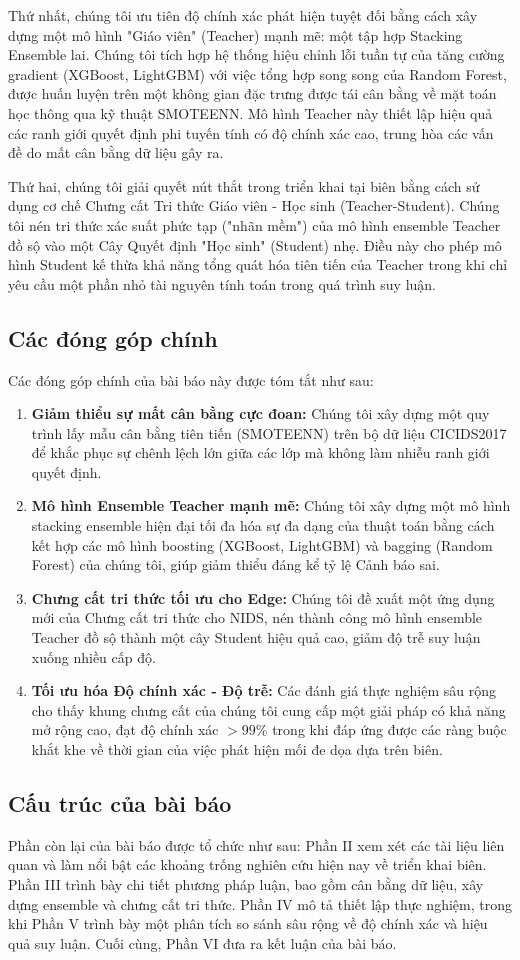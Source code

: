 Thứ nhất, chúng tôi ưu tiên độ chính xác phát hiện tuyệt đối bằng cách xây dựng một mô hình "Giáo viên" (Teacher) mạnh mẽ: một tập hợp Stacking Ensemble lai. Chúng tôi tích hợp hệ thống hiệu chỉnh lỗi tuần tự của tăng cường gradient (XGBoost, LightGBM) với việc tổng hợp song song của Random Forest, được huấn luyện trên một không gian đặc trưng được tái cân bằng về mặt toán học thông qua kỹ thuật SMOTEENN. Mô hình Teacher này thiết lập hiệu quả các ranh giới quyết định phi tuyến tính có độ chính xác cao, trung hòa các vấn đề do mất cân bằng dữ liệu gây ra.

Thứ hai, chúng tôi giải quyết nút thắt trong triển khai tại biên bằng cách sử dụng cơ chế Chưng cất Tri thức Giáo viên - Học sinh (Teacher-Student). Chúng tôi nén tri thức xác suất phức tạp ("nhãn mềm") của mô hình ensemble Teacher đồ sộ vào một Cây Quyết định "Học sinh" (Student) nhẹ. Điều này cho phép mô hình Student kế thừa khả năng tổng quát hóa tiên tiến của Teacher trong khi chỉ yêu cầu một phần nhỏ tài nguyên tính toán trong quá trình suy luận.

\subsection{Các đóng góp chính}
Các đóng góp chính của bài báo này được tóm tắt như sau:
\begin{enumerate}
    \item \textbf{Giảm thiểu sự mất cân bằng cực đoan:} Chúng tôi xây dựng một quy trình lấy mẫu cân bằng tiên tiến (SMOTEENN) trên bộ dữ liệu CICIDS2017 để khắc phục sự chênh lệch lớn giữa các lớp mà không làm nhiễu ranh giới quyết định.
    \item \textbf{Mô hình Ensemble Teacher mạnh mẽ:} Chúng tôi xây dựng một mô hình stacking ensemble hiện đại tối đa hóa sự đa dạng của thuật toán bằng cách kết hợp các mô hình boosting (XGBoost, LightGBM) và bagging (Random Forest) của chúng tôi, giúp giảm thiểu đáng kể tỷ lệ Cảnh báo sai.
    \item \textbf{Chưng cất tri thức tối ưu cho Edge:} Chúng tôi đề xuất một ứng dụng mới của Chưng cất tri thức cho NIDS, nén thành công mô hình ensemble Teacher đồ sộ thành một cây Student hiệu quả cao, giảm độ trễ suy luận xuống nhiều cấp độ.
    \item \textbf{Tối ưu hóa Độ chính xác - Độ trễ:} Các đánh giá thực nghiệm sâu rộng cho thấy khung chưng cất của chúng tôi cung cấp một giải pháp có khả năng mở rộng cao, đạt độ chính xác $>99\%$ trong khi đáp ứng được các ràng buộc khắt khe về thời gian của việc phát hiện mối đe dọa dựa trên biên.
\end{enumerate}

\subsection{Cấu trúc của bài báo}
Phần còn lại của bài báo được tổ chức như sau: Phần II xem xét các tài liệu liên quan và làm nổi bật các khoảng trống nghiên cứu hiện nay về triển khai biên. Phần III trình bày chi tiết phương pháp luận, bao gồm cân bằng dữ liệu, xây dựng ensemble và chưng cất tri thức. Phần IV mô tả thiết lập thực nghiệm, trong khi Phần V trình bày một phân tích so sánh sâu rộng về độ chính xác và hiệu quả suy luận. Cuối cùng, Phần VI đưa ra kết luận của bài báo.
